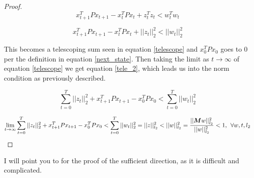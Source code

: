\documentclass{article}[12pt]
\begin{document}
\begin{proof}
\begin{equation}
    \label{final_lmi2}
    x_{t+1}^T P x_{t+1} - x_t^T P x_t + z_t^Tz_t < w_t^T w_t 
\end{equation}

\begin{equation}
    \label{final_lmi3}
    x_{t+1}^T P x_{t+1} - x_t^T P x_t + ||z_t||^2_2 < ||w_t||^2_2 
\end{equation}

\noindent This becomes a telescoping sum seen in equation \ref{telescope} and $ x_0^T P x_0$ goes to 0 per the definition in equation \ref{next_state}. Then taking the limit as $t \to \infty$ of equation \ref{telescope} we get equation \ref{tele_2}, which leads us into the norm condition as previously described. 

\begin{equation}
\label{telescope}
    \sum_{t=0}^T ||z_t||_2^2 + x_{t+1}^T P x_{t+1} - x_0^T P x_0 < \sum_{t=0}^T ||w_t||^2_2  
\end{equation}

\begin{equation}
    \label{tele_2}
    \lim_{t\to\infty} \sum_{t=0}^T ||z_t||_2^2 + x_{t+1}^T P x_{t+1} - x_0^T P x_0 < \sum_{t=0}^T ||w_t||^2_2 \\= ||z||^2_{l_2} < ||w||^2_{l_2} = \frac{||\boldsymbol{M}w||^2_{l_2}}{||w||^2_{l_2}} < 1, \: \: \forall w,t,l_2 
\end{equation}

\end{proof}
\noindent I will point you to \cite{RANTZER19967} for the proof of the sufficient direction, as it is difficult and complicated.
\end{document}
